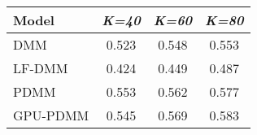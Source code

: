 \begin{tabular}{|l|ccc|}
\hline
\textbf{Model} & \textit{K=40} & \textit{K=60} & \textit{K=80} \\
\hline
           DMM &         0.523 &         0.548 &         0.553 \\
        LF-DMM &         0.424 &         0.449 &         0.487 \\
          PDMM &         0.553 &         0.562 &         0.577 \\
      GPU-PDMM &         0.545 &         0.569 &         0.583 \\
\hline
\end{tabular}
